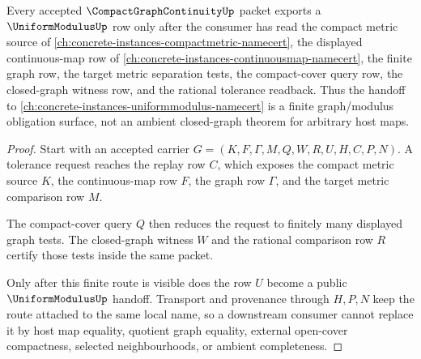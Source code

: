 \begin{theorem}
\label{thm:compact-graph-continuity-uniform-modulus-handoff}
Every accepted $\CompactGraphContinuityUp$ packet exports a $\UniformModulusUp$ row only after the consumer has read the compact metric source of \autoref{ch:concrete-instances-compactmetric-namecert}, the displayed continuous-map row of \autoref{ch:concrete-instances-continuousmap-namecert}, the finite graph row, the target metric separation tests, the compact-cover query row, the closed-graph witness row, and the rational tolerance readback. Thus the handoff to \autoref{ch:concrete-instances-uniformmodulus-namecert} is a finite graph/modulus obligation surface, not an ambient closed-graph theorem for arbitrary host maps.
\end{theorem}
\begin{proof}
Start with an accepted carrier $G=(K,F,\Gamma,M,Q,W,R,U,H,C,P,N)$. A tolerance request reaches the replay row $C$, which exposes the compact metric source $K$, the continuous-map row $F$, the graph row $\Gamma$, and the target metric comparison row $M$.

The compact-cover query $Q$ then reduces the request to finitely many displayed graph tests. The closed-graph witness $W$ and the rational comparison row $R$ certify those tests inside the same packet.

Only after this finite route is visible does the row $U$ become a public $\UniformModulusUp$ handoff. Transport and provenance through $H,P,N$ keep the route attached to the same local name, so a downstream consumer cannot replace it by host map equality, quotient graph equality, external open-cover compactness, selected neighbourhoods, or ambient completeness.
\end{proof}



